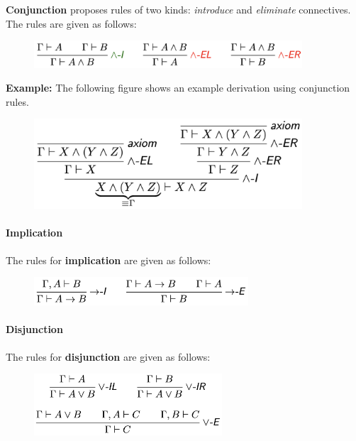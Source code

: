\documentclass[a4paper]{extarticle}
\begin{document}
\textbf{Conjunction} proposes rules of two kinds: \textit{introduce} and \textit{eliminate} connectives. The rules are given as follows:

\begin{figure}[H]
    \includegraphics[width=10cm]{../images/FMFP_Fig1-5}
    \centering
\end{figure}

\begin{ebox}
    \textbf{Example:} The following figure shows an example derivation using conjunction rules.

    \begin{figure}[H]
        \includegraphics[width=10cm]{../images/FMFP_Fig1-6}
        \centering
    \end{figure}
\end{ebox}

\paragraph{Implication}

The rules for \textbf{implication} are given as follows:

\begin{figure}[H]
    \includegraphics[width=8cm]{../images/FMFP_Fig1-7}
    \centering
\end{figure}

\paragraph{Disjunction}

The rules for \textbf{disjunction} are given as follows:

\begin{figure}[H]
    \includegraphics[width=7cm]{../images/FMFP_Fig1-8}
    \centering
\end{figure}
\end{document}
